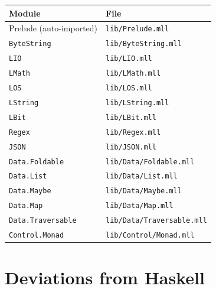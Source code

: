 \documentclass[11pt,a4paper]{article}
\begin{document}
\begin{tabular}{@{}ll@{}}
\toprule
\textbf{Module} & \textbf{File} \\
\midrule
Prelude (auto-imported) & \texttt{lib/Prelude.mll} \\
\texttt{ByteString}     & \texttt{lib/ByteString.mll} \\
\texttt{LIO}            & \texttt{lib/LIO.mll} \\
\texttt{LMath}          & \texttt{lib/LMath.mll} \\
\texttt{LOS}            & \texttt{lib/LOS.mll} \\
\texttt{LString}        & \texttt{lib/LString.mll} \\
\texttt{LBit}           & \texttt{lib/LBit.mll} \\
\texttt{Regex}          & \texttt{lib/Regex.mll} \\
\texttt{JSON}           & \texttt{lib/JSON.mll} \\
\texttt{Data.Foldable}  & \texttt{lib/Data/Foldable.mll} \\
\texttt{Data.List}      & \texttt{lib/Data/List.mll} \\
\texttt{Data.Maybe}     & \texttt{lib/Data/Maybe.mll} \\
\texttt{Data.Map}       & \texttt{lib/Data/Map.mll} \\
\texttt{Data.Traversable} & \texttt{lib/Data/Traversable.mll} \\
\texttt{Control.Monad}  & \texttt{lib/Control/Monad.mll} \\
\bottomrule
\end{tabular}

\section{Deviations from Haskell}
\end{document}
